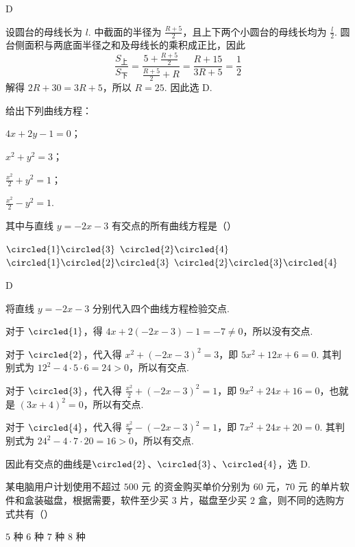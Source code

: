 \begin{answer}
D
\end{answer}

\begin{solution}
设圆台的母线长为 \(l\). 中截面的半径为 \(\frac{R+5}{2}\)，且上下两个小圆台的母线长均为 \(\frac{l}{2}\). 圆台侧面积与两底面半径之和及母线长的乘积成正比，因此
\[
\frac{S_{\text{上}}}{S_{\text{下}}}
=\frac{5+\frac{R+5}{2}}{\frac{R+5}{2}+R}
=\frac{R+15}{3R+5}=\frac12
\]
解得 \(2R+30=3R+5\)，所以 \(R=25\). 因此选 D.
\end{solution}

\begin{problem}
给出下列曲线方程：

\begin{circlelist}
\item \(4x+2y-1=0\)；
\item \(x^2+y^2=3\)；
\item \(\frac{x^2}{2}+y^2=1\)；
\item \(\frac{x^2}{2}-y^2=1\).
\end{circlelist}

其中与直线 \(y=-2x-3\) 有交点的所有曲线方程是（\quad）

\choices
    {\(\circled{1}\circled{3}\)}
    {\(\circled{2}\circled{4}\)}
    {\(\circled{1}\circled{2}\circled{3}\)}
    {\(\circled{2}\circled{3}\circled{4}\)}
\end{problem}

\begin{answer}
D
\end{answer}

\begin{solution}
将直线 \(y=-2x-3\) 分别代入四个曲线方程检验交点.

对于 \(\circled{1}\)，得 \(4x+2(-2x-3)-1=-7\neq0\)，所以没有交点.

对于 \(\circled{2}\)，代入得
\(x^2+(-2x-3)^2=3\)，即 \(5x^2+12x+6=0\). 其判别式为 \(12^2-4\cdot5\cdot6=24>0\)，所以有交点.

对于 \(\circled{3}\)，代入得
\(\frac{x^2}{2}+(-2x-3)^2=1\)，即 \(9x^2+24x+16=0\)，也就是 \((3x+4)^2=0\)，所以有交点.

对于 \(\circled{4}\)，代入得
\(\frac{x^2}{2}-(-2x-3)^2=1\)，即 \(7x^2+24x+20=0\). 其判别式为 \(24^2-4\cdot7\cdot20=16>0\)，所以有交点.

因此有交点的曲线是\(\circled{2}\)、\(\circled{3}\)、\(\circled{4}\)，选 D.
\end{solution}

\begin{problem}
某电脑用户计划使用不超过 \(500\text{ 元}\) 的资金购买单价分别为 \(60\text{ 元}\)，\(70\text{ 元}\) 的单片软件和盒装磁盘，根据需要，软件至少买 \(3\text{ 片}\)，磁盘至少买 \(2\text{ 盒}\)，则不同的选购方式共有（\quad）

\choices
    {\(5\text{ 种}\)}
    {\(6\text{ 种}\)}
    {\(7\text{ 种}\)}
    {\(8\text{ 种}\)}
\end{problem}

